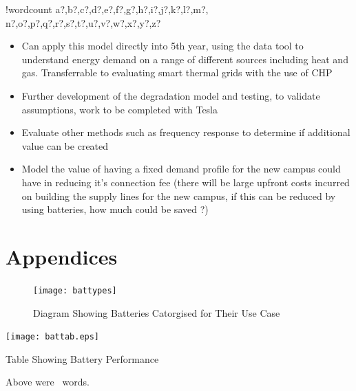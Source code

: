 \documentclass[fontsize=9.5pt]{extarticle}
\numberwithin{figure}{section} %
\providecommand{\tightlist}{%
  \setlength{\itemsep}{0pt}\setlength{\parskip}{0pt}}
\newcounter{words}
\newenvironment{counted}{%
  \setcounter{words}{0}
  \SearchList!{wordcount}{\stepcounter{words}}
    {a?,b?,c?,d?,e?,f?,g?,h?,i?,j?,k?,l?,m?,
    n?,o?,p?,q?,r?,s?,t?,u?,v?,w?,x?,y?,z?}
  \UndoBoundary{'}
  \SearchOrder{p;}}{%
  \StopSearching}
\begin{document}
\begin{counted}
\begin{itemize}
\tightlist
\item
  Can apply this model directly into 5th year, using the data tool to
  understand energy demand on a range of different sources including
  heat and gas. Transferrable to evaluating smart thermal grids with the
  use of CHP
\item
  Further development of the degradation model and testing, to validate
  assumptions, work to be completed with Tesla
\item
  Evaluate other methods such as frequency response to determine if
  additional value can be created
\item
  Model the value of having a fixed demand profile for the new campus
  could have in reducing it's connection fee (there will be large
  upfront costs incurred on building the supply lines for the new
  campus, if this can be reduced by using batteries, how much could be
  saved ?)
\end{itemize}

\newpage

\section{Appendices}

\begin{figure}[H]
\centering
\texttt{[image: battypes]}
\caption{Diagram Showing Batteries Catorgised for Their Use Case \cite{Dunn928}}
\label{battypes}
\end{figure}

\begin{landscape}

\begin{table}[H]
\centering
\texttt{[image: battab.eps]}
\caption{Table Showing Battery Performance}
\label{battabs}
\end{table}

\end{landscape}
\end{counted} %
Above were \thewords\ words. %
\newpage

% 

\printbibliography
\end{document}
